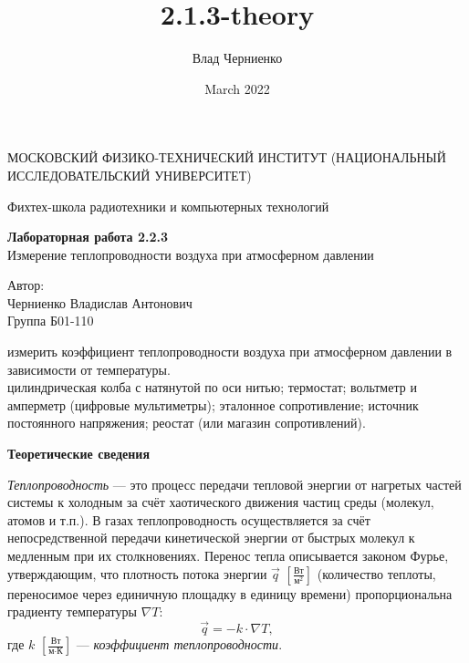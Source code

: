 \documentclass[a4paper, 12pt]{article}
\title{2.1.3-theory}
\author{Влад Черниенко}
\date{March 2022}
\begin{document}
    \begin{titlepage}
    
        \begin{center}
            {\large МОСКОВСКИЙ ФИЗИКО-ТЕХНИЧЕСКИЙ ИНСТИТУТ (НАЦИОНАЛЬНЫЙ ИССЛЕДОВАТЕЛЬСКИЙ УНИВЕРСИТЕТ)}
        \end{center}
        \begin{center}
            {\large Фихтех-школа радиотехники и компьютерных технологий}
        \end{center}
        
        \vspace{4.5cm}
        
        {\huge
            \begin{center}
                {\bf Лабораторная работа 2.2.3}\\
                Измерение теплопроводности воздуха при атмосферном давлении
            \end{center}
        }
        
        \vspace{10cm}
        
        \begin{flushright}
            {\LARGE Автор: \\ Черниенко Владислав Антонович \\ \vspace{0.2cm} Группа Б01-110}
        \end{flushright}
        
    \end{titlepage}
    
    
     измерить коэффициент теплопроводности воздуха при атмосферном давлении в зависимости от температуры.\\
    
     цилиндрическая колба с натянутой по оси нитью; термостат; вольтметр и амперметр (цифровые мультиметры); эталонное сопротивление; источник постоянного напряжения; реостат (или магазин сопротивлений).\\
    
    \begin{center}
        {\Large {\bf Теоретические сведения}}
    \end{center}
    
    \textit{Теплопроводность} — это процесс передачи тепловой энергии от нагретых частей системы к холодным за счёт хаотического движения частиц среды (молекул, атомов и т.п.). В газах теплопроводность осуществляется за счёт непосредственной передачи кинетической энергии от быстрых молекул к медленным при их столкновениях. Перенос тепла описывается законом Фурье, утверждающим, что плотность потока энергии $ \vec{q} $ $ [\frac{\text{Вт}}{\text{м}^2}] $ (количество теплоты, переносимое через единичную площадку в единицу времени) пропорциональна градиенту температуры $ \nabla T $:
    \begin{equation}
        \vec{q}=-k \cdot \nabla T,
        \label{first}
    \end{equation}
    где $ k $ $ [\frac{\text{Вт}}{\text{м} \cdot \text{К}}] $ — \textit{коэффициент теплопроводности}.
    
\end{document}
